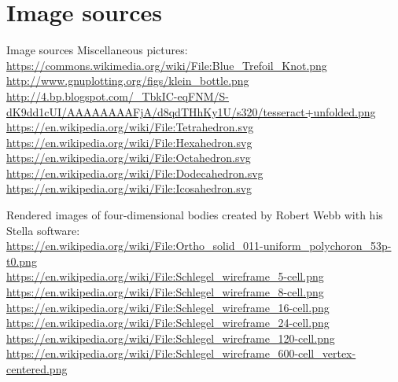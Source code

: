\documentclass[12pt,compress,ngerman,utf8,t]{beamer}
\begin{document}
\appendix

\section{Image sources}

\begin{frame}{Image sources}
  \tiny
  Miscellaneous pictures: \\
  \url{https://commons.wikimedia.org/wiki/File:Blue_Trefoil_Knot.png} \\
  \url{http://www.gnuplotting.org/figs/klein_bottle.png} \\
  \url{http://4.bp.blogspot.com/_TbkIC-eqFNM/S-dK9dd1cUI/AAAAAAAAFjA/d8qdTHhKy1U/s320/tesseract+unfolded.png} \\
  \url{https://en.wikipedia.org/wiki/File:Tetrahedron.svg} \\
  \url{https://en.wikipedia.org/wiki/File:Hexahedron.svg} \\
  \url{https://en.wikipedia.org/wiki/File:Octahedron.svg} \\
  \url{https://en.wikipedia.org/wiki/File:Dodecahedron.svg} \\
  \url{https://en.wikipedia.org/wiki/File:Icosahedron.svg}
  \bigskip

  Rendered images of four-dimensional bodies created by Robert Webb with his
  Stella software: \\
  \url{https://en.wikipedia.org/wiki/File:Ortho_solid_011-uniform_polychoron_53p-t0.png} \\
  \url{https://en.wikipedia.org/wiki/File:Schlegel_wireframe_5-cell.png} \\
  \url{https://en.wikipedia.org/wiki/File:Schlegel_wireframe_8-cell.png} \\
  \url{https://en.wikipedia.org/wiki/File:Schlegel_wireframe_16-cell.png} \\
  \url{https://en.wikipedia.org/wiki/File:Schlegel_wireframe_24-cell.png} \\
  \url{https://en.wikipedia.org/wiki/File:Schlegel_wireframe_120-cell.png} \\
  \url{https://en.wikipedia.org/wiki/File:Schlegel_wireframe_600-cell_vertex-centered.png} \\
\end{frame}
\addtocounter{framenumber}{-1}
\end{document}
